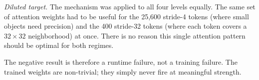\emph{Diluted target.} The mechanism was applied to all four levels equally. The same set of attention weights had to be useful for the 25{,}600 stride-4 tokens (where small objects need precision) and the 400 stride-32 tokens (where each token covers a $32{\times}32$ neighborhood) at once. There is no reason this single attention pattern should be optimal for both regimes.

The negative result is therefore a runtime failure, not a training failure. The trained weights are non-trivial; they simply never fire at meaningful strength.
